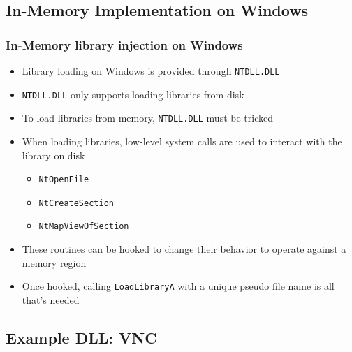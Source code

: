 \documentclass{beamer}
\newenvironment{sitemize}{\vspace{1mm}\begin{itemize}\itemsep 4pt\small}{\end{itemize}}
\begin{document}
\subsection{In-Memory Implementation on Windows}

\begin{frame}[t]
    \frametitle{In-Memory library injection on Windows}

    \begin{sitemize}
        \item Library loading on Windows is provided through \texttt{NTDLL.DLL}
        \item \texttt{NTDLL.DLL} only supports loading libraries from disk
    \end{sitemize}

    \pause
    \begin{sitemize}
        \item To load libraries from memory, \texttt{NTDLL.DLL} must be tricked

        \pause
        \item When loading libraries, low-level system calls are used to interact with the library on disk
        \begin{sitemize}
            \item \texttt{NtOpenFile}
            \item \texttt{NtCreateSection}
            \item \texttt{NtMapViewOfSection}
        \end{sitemize}
        \item These routines can be hooked to change their behavior to operate against a memory region
    \end{sitemize}

    \pause
    \begin{sitemize}
        \item Once hooked, calling \texttt{LoadLibraryA} with a unique pseudo file name is all that's needed
    \end{sitemize}
\end{frame}

\subsection{Example DLL: VNC}
\end{document}

